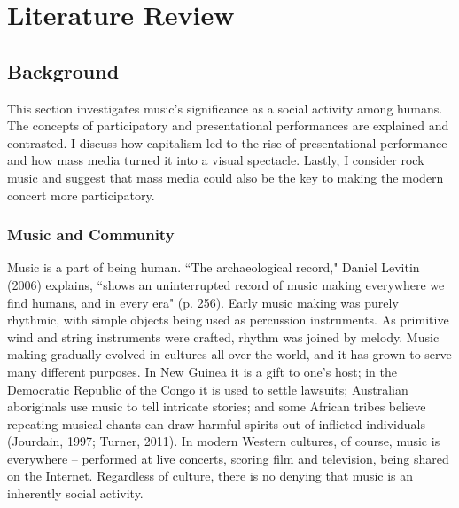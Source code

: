 \chapter{Literature Review}

\section{Background}

This section investigates music's significance as a social activity among humans. The concepts of participatory and presentational performances are explained and contrasted. I discuss how capitalism led to the rise of presentational performance and how mass media turned it into a visual spectacle. Lastly, I consider rock music and suggest that mass media could also be the key to making the modern concert more participatory.

\subsection{Music and Community}

Music is a part of being human. ``The archaeological record," Daniel Levitin (2006) explains, ``shows an uninterrupted record of music making everywhere we find humans, and in every era" (p. 256). Early music making was purely rhythmic, with simple objects being used as percussion instruments. As primitive wind and string instruments were crafted, rhythm was joined by melody. Music making gradually evolved in cultures all over the world, and it has grown to serve many different purposes. In New Guinea it is a gift to one's host; in the Democratic Republic of the Congo it is used to settle lawsuits; Australian aboriginals use music to tell intricate stories; and some African tribes believe repeating musical chants can draw harmful spirits out of inflicted individuals (Jourdain, 1997; Turner, 2011). In modern Western cultures, of course, music is everywhere -- performed at live concerts, scoring film and television, being shared on the Internet. Regardless of culture, there is no denying that music is an inherently social activity.

